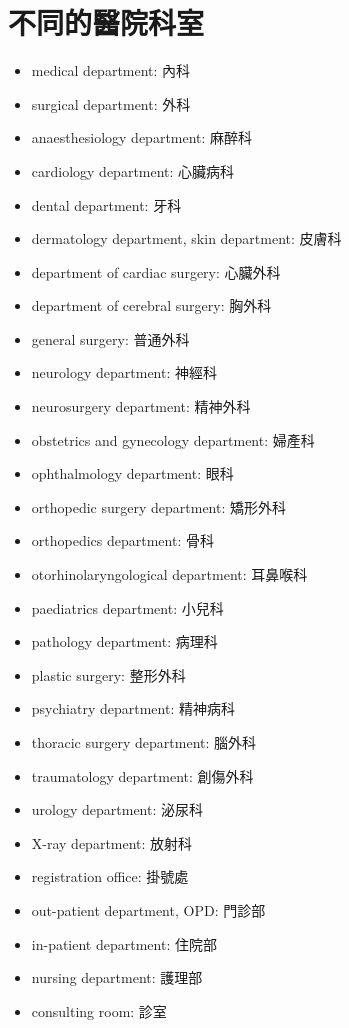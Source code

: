 \section{不同的醫院科室}
\begin{multicols}{2}
\begin{itemize}
  \itemsep0em
  \item medical department: 內科
  \item surgical department: 外科
  \item anaesthesiology department: 麻醉科
  \item cardiology department: 心臟病科
  \item dental department: 牙科
  \item dermatology department, skin department: 皮膚科
  \item department of cardiac surgery: 心臟外科
  \item department of cerebral surgery: 胸外科
  \item general surgery: 普通外科
  \item neurology department: 神經科
  \item neurosurgery department: 精神外科
  \item obstetrics and gynecology department: 婦產科
  \item ophthalmology department: 眼科
  \item orthopedic surgery department: 矯形外科
  \item orthopedics department: 骨科
  \item otorhinolaryngological department: 耳鼻喉科
  \item paediatrics department: 小兒科
  \item pathology department: 病理科
  \item plastic surgery: 整形外科
  \item psychiatry department: 精神病科
  \item thoracic surgery department: 腦外科
  \item traumatology department: 創傷外科
  \item urology department: 泌尿科
  \item X-ray department: 放射科
  \item registration office: 掛號處
  \item out-patient department, OPD: 門診部
  \item in-patient department: 住院部
  \item nursing department: 護理部
  \item consulting room: 診室

\end{itemize}
\end{multicols}
